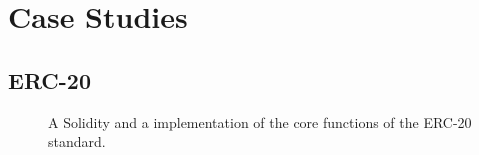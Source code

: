 \documentclass[sigconf]{acmart}
\begin{document}
\section{Case Studies}
\subsection{ERC-20}
\begin{figure*}[h]
    \centering
    \begin{minipage}[t]{0.5\textwidth}
        
    \end{minipage}%
    \begin{minipage}[t]{0.5\textwidth}
        
    \end{minipage}
    \caption{A Solidity and a \langName implementation of the core functions of the ERC-20 standard.}
    \label{fig:erc20-impl}
\end{figure*}
\end{document}
